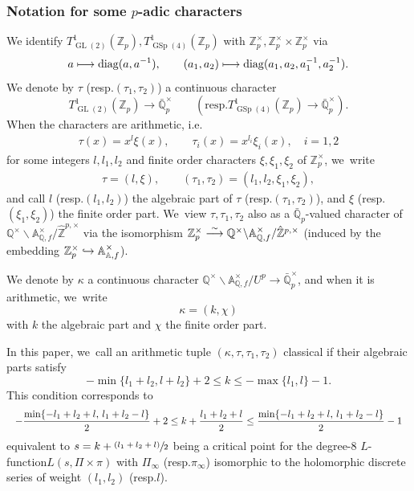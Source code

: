 \documentclass[10pt]{amsart}
\newcommand{\resp}{resp.}
\newcommand{\ie}{i.e.}
\newcommand{\psfrac}[2]{\sfrac{(#1)}{#2}}
\newcommand\mto{\mathchoice{\longmapsto}{\mapsto}{\mapsto}{\mapsto}}
\newcommand\hto{\mathrel{\lhook\joinrel\to}}
\newcommand\To[1]{\mathchoice{\xrightarrow{\textstyle\kern4pt#1\kern3pt}}{\stackrel{#1}{\longrightarrow}}{}{}}
\newcommand{\Lfunction}{$L$\nobreakdash-func\-tion\xspace}
\theoremstyle{plain}
\theoremstyle{remark}
\newcommand{\bA}{\mathbb{A}}
\newcommand{\bQ}{\mathbb{Q}}
\newcommand{\bZ}{\mathbb{Z}}
\DeclareMathOperator{\GL}{GL}
\DeclareMathOperator{\GSp}{GSp}
\newcommand{\diag}{\mathrm{diag}}
\begin{document}
\subsubsection{Notation for some \texorpdfstring{$p$}{p}-adic characters}\label{sec:pchar}
We identify $T^1_{\GL(2)}(\bZ_p), T^1_{\GSp(4)}(\bZ_p)$ with $\bZ^\times_p,\bZ^\times_p\times\bZ^\times_p$ via
\begin{align*}
a\mto \diag(a,a^{-1}),\qquad
(a_1,a_2)\mto \diag(a_1,a_2,a^{-1}_1,a^{-1}_2).
\end{align*}
We denote by $\tau$ (\resp $(\tau_1,\tau_2)$) a continuous character
\[
T^1_{\GL(2)}(\bZ_p)\to\bar{\bQ}^\times_p\qquad (\text{\resp} T^1_{\GSp(4)}(\bZ_p)\to\bar{\bQ}^\times_p). 
\]
When the characters are arithmetic, \ie
\begin{align*}
\tau(x)=x^l\xi(x),
\qquad
\tau_i(x)=x^{l_i}\xi_i(x),\quad i=1,2
\end{align*}
for some integers $l,l_1,l_2$ and finite order characters $\xi,\xi_1,\xi_2$ of $\bZ^\times_p$, we~write
\begin{align*}
\tau=(l,\xi),
\qquad
(\tau_1,\tau_2)=(l_1,l_2,\xi_1,\xi_2),
\end{align*}
and call $l$ (\resp $(l_1,l_2)$) the algebraic part of $\tau$ (\resp $(\tau_1,\tau_2)$), and $\xi$ (\resp $(\xi_1,\xi_2)$) the finite order part. We~view $\tau,\tau_1,\tau_2$ also as a $\bar{\bQ}_p$-valued character of $\bQ^\times\backslash \bA^\times_{\bQ,f}/\hat{\bZ}^{p,\times}$ via the isomorphism $\bZ^\times_p\To{\sim}\bQ^\times\backslash \bA^\times_{\bQ,f}/\hat{\bZ}^{p,\times}$ (induced by the embedding $\bZ^\times_p\hto \bA^\times_{\bA,f}$).

We denote by $\kappa$ a continuous character $\bQ^\times\backslash\bA^\times_{\bQ,f}/U^p \to\bar{\bQ}^\times_p$, and when it is arithmetic, we~write
\[
\kappa=(k,\chi)
\]
with $k$ the algebraic part and $\chi$ the finite order part.

In this paper, we~call an arithmetic tuple $(\kappa,\tau,\tau_1,\tau_2)$ classical if their algebraic parts satisfy
\begin{equation}\label{eq:k-crt}
-\min\{l_1+l_2,l+l_2\}+2\leq k\leq -\max\{l_1,l\}-1.
\end{equation}
This condition corresponds to
\[
\resizebox{\textwidth}{!}
{$\displaystyle
-\frac{\min\{-l_1+l_2+l,\,l_1+l_2-l\}}{2}+2 \leq k+\frac{l_1+l_2+l}{2}\leq \frac{\min\{-l_1+l_2+l,\,l_1+l_2-l\}}{2}-1
$}
\]
equivalent to $s=k+\psfrac{l_1+l_2+l}{2}$ being a critical point for the degree-8 \Lfunction $L(s,\Pi\times\pi)$ with $\Pi_\infty$ (\resp $\pi_\infty$) isomorphic to the holomorphic discrete series of weight $(l_1,l_2)$ (\resp $l$).
\end{document}
